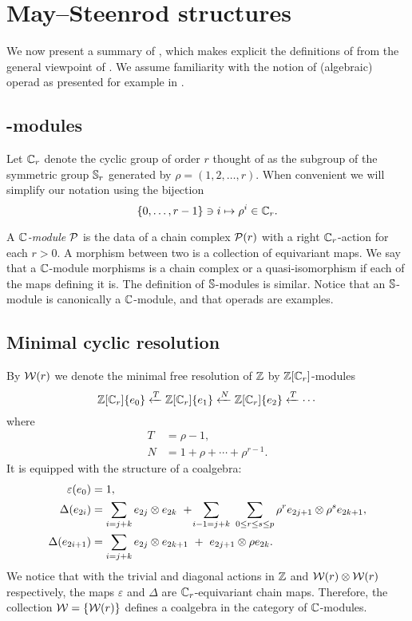 
\section{May--Steenrod structures}

We now present a summary of \cite{medina2021may_st}, which makes explicit the definitions of \cite{steenrod1953cyclic} from the general viewpoint of \cite{may1970general}.
We assume familiarity with the notion of (algebraic) operad as presented for example in \cite{loday2012operads}.

\subsection{\pdfC-modules}

Let $\mathbb{C}_r$ denote the cyclic group of order $r$ thought of as the subgroup of the symmetric group $\mathbb{S}_r$ generated by $\rho = (1,2,\dots,r)$.
When convenient we will simplify our notation using the bijection
\[
\{0,\dots,r-1\} \ni i \mapsto \rho^i \in \mathbb{C}_r.
\]

A \textit{$\mathbb{C}$-module} $\mathcal{P}$ is the data of a chain complex $\mathcal{P}(r)$ with a right $\mathbb{C}_r$-action for each $r > 0$.
A morphism between two is a collection of equivariant maps.
We say that a $\mathbb{C}$-module morphisms is a chain complex or a quasi-isomorphism if each of the maps defining it is.
The definition of $\mathbb{S}$-modules is similar.
Notice that an $\mathbb{S}$-module is canonically a $\mathbb{C}$-module, and that operads are examples.

\subsection{Minimal cyclic resolution}

By $\mathcal{W}(r)$ we denote the minimal free resolution of $\mathbb{Z}$ by $\mathbb{Z}[\mathbb{C}_r]$-modules
\begin{equation}\label{eq: minimal resolution}
	\mathbb{Z}[\mathbb{C}_r]\{e_0\} \xleftarrow{T} \mathbb{Z}[\mathbb{C}_r]\{e_1\} \xleftarrow{N} \mathbb{Z}[\mathbb{C}_r]\{e_2\} \xleftarrow{T} \cdots
\end{equation}
where
\begin{equation} \label{eq: T and R definition}
	\begin{split}
		T &= \rho - 1, \\
		N &= 1 + \rho + \cdots + \rho^{r-1}.
	\end{split}
\end{equation}
It is equipped with the structure of a coalgebra:
\begin{align*}
	\varepsilon(e_0) &= 1, \\
	\Delta(e_{2i}) &=
	\sum_{i=j+k} e_{2j} \otimes e_{2k} \ + \! \sum_{i-1=j+k} \ \sum_{0 \leq r \leq s \leq p} \rho^r e_{2j+1} \otimes \rho^s e_{2k+1}, \\
	\Delta(e_{2i+1}) &=
	\sum_{i=j+k} e_{2j} \otimes e_{2k+1} \ +\ e_{2j+1} \otimes \rho e_{2k}.
\end{align*}
We notice that with the trivial and diagonal actions in $\mathbb{Z}$ and $\mathcal{W}(r) \otimes \mathcal{W}(r)$ respectively, the maps $\varepsilon$ and $\Delta$ are $\mathbb{C}_r$-equivariant chain maps.
Therefore, the collection $\mathcal{W} = \{\mathcal{W}(r)\}$ defines a coalgebra in the category of $\mathbb{C}$-modules.

